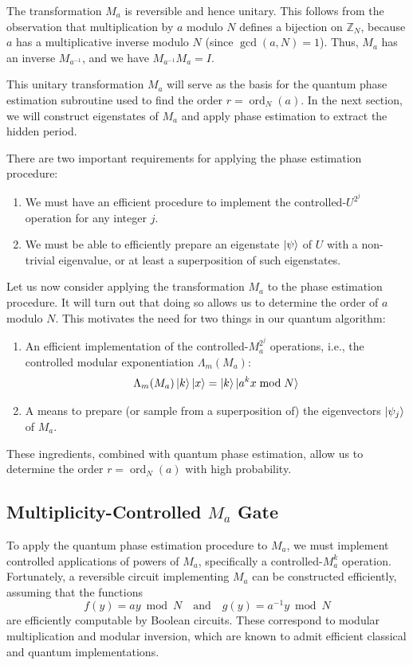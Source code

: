 The transformation $M_a$ is reversible and hence unitary. This follows from the observation that multiplication by $a$ modulo $N$ defines a bijection on $\mathbb{Z}_N$, because $a$ has a multiplicative inverse modulo $N$ (since $\gcd(a, N) = 1$). Thus, $M_a$ has an inverse $M_{a^{-1}}$, and we have $M_{a^{-1}} M_a = I$.

This unitary transformation $M_a$ will serve as the basis for the quantum phase estimation subroutine used to find the order $r = \operatorname{ord}_N(a)$. In the next section, we will construct eigenstates of $M_a$ and apply phase estimation to extract the hidden period.

There are two important requirements for applying the phase estimation procedure: 

\begin{enumerate}
    \item We must have an efficient procedure to implement the controlled-$U^{2^j}$ operation for any integer $j$.
    \item We must be able to efficiently prepare an eigenstate $\ket{\psi}$ of $U$ with a non-trivial eigenvalue, or at least a superposition of such eigenstates.
\end{enumerate}

Let us now consider applying the transformation $M_a$ to the phase estimation procedure. It will turn out that doing so allows us to determine the order of $a$ modulo $N$. This motivates the need for two things in our quantum algorithm:
\begin{enumerate}
    \item An efficient implementation of the controlled-$M_a^{2^j}$ operations, i.e., the controlled modular exponentiation $\Lambda_m(M_a)$:
    \[
    \Lambda_m(M_a) \ket{k} \ket{x} = \ket{k} \ket{a^k x \bmod N}
    \]
    \item A means to prepare (or sample from a superposition of) the eigenvectors $\ket{\psi_j}$ of $M_a$.
\end{enumerate}
These ingredients, combined with quantum phase estimation, allow us to determine the order $r = \operatorname{ord}_N(a)$ with high probability.

\subsection{Multiplicity-Controlled \texorpdfstring{$M_a$}{Ma} Gate}
To apply the quantum phase estimation procedure to $M_a$, we must implement controlled applications of powers of $M_a$, specifically a controlled-$M_a^k$ operation. Fortunately, a reversible circuit implementing $M_a$ can be constructed efficiently, assuming that the functions
\[
f(y) = ay \bmod N \quad \text{and} \quad g(y) = a^{-1}y \bmod N
\]
are efficiently computable by Boolean circuits. These correspond to modular multiplication and modular inversion, which are known to admit efficient classical and quantum implementations.

